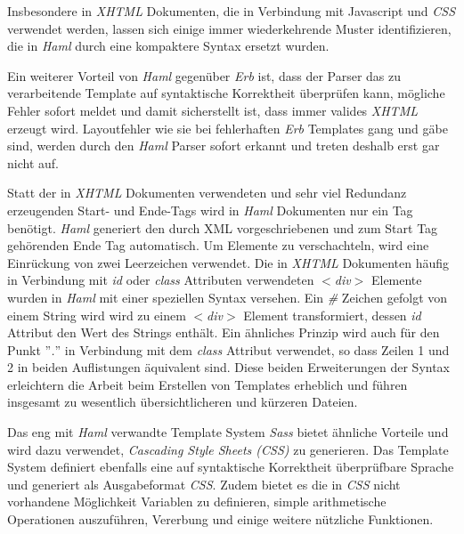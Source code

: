 

Insbesondere in \textit{XHTML} Dokumenten, die in Verbindung mit
Javascript und \textit{CSS} verwendet werden, lassen sich einige immer
wiederkehrende Muster identifizieren, die in \textit{Haml} durch eine
kompaktere Syntax ersetzt wurden.

Ein weiterer Vorteil von \textit{Haml} gegenüber \textit{Erb} ist,
dass der Parser das zu verarbeitende Template auf syntaktische
Korrektheit überprüfen kann, mögliche Fehler sofort meldet und damit
sicherstellt ist, dass immer valides \textit{XHTML} erzeugt
wird. Layoutfehler wie sie bei fehlerhaften \textit{Erb} Templates
gang und gäbe sind, werden durch den \textit{Haml} Parser sofort
erkannt und treten deshalb erst gar nicht auf.

Statt der in \textit{XHTML} Dokumenten verwendeten und sehr viel
Redundanz erzeugenden Start- und Ende-Tags wird in \textit{Haml}
Dokumenten nur ein Tag benötigt. \textit{Haml} generiert den durch XML
 vorgeschriebenen und
zum Start Tag gehörenden Ende Tag automatisch. Um Elemente zu
verschachteln, wird eine Einrückung von zwei Leerzeichen
verwendet. Die in \textit{XHTML} Dokumenten häufig in Verbindung mit
\textit{id} oder \textit{class} Attributen verwendeten
\textit{$<$div$>$} Elemente wurden in \textit{Haml} mit einer
speziellen Syntax versehen. Ein \textit{\#} Zeichen gefolgt von einem
String wird wird zu einem \textit{$<$div$>$} Element transformiert,
dessen \textit{id} Attribut den Wert des Strings enthält. Ein
ähnliches Prinzip wird auch für den Punkt ''\textit{.}''  in
Verbindung mit dem \textit{class} Attribut verwendet, so dass Zeilen 1
und 2 in beiden Auflistungen äquivalent sind. Diese beiden
Erweiterungen der Syntax erleichtern die Arbeit beim Erstellen von
Templates erheblich und führen insgesamt zu wesentlich
übersichtlicheren und kürzeren Dateien.

Das eng mit \textit{Haml} verwandte Template System \textit{Sass}
bietet ähnliche Vorteile und wird dazu verwendet, \textit{Cascading
  Style Sheets (CSS)} zu generieren. Das Template System definiert
ebenfalls eine auf syntaktische Korrektheit überprüfbare Sprache und
generiert als Ausgabeformat \textit{CSS}. Zudem bietet es die in
\textit{CSS} nicht vorhandene Möglichkeit Variablen zu definieren,
simple arithmetische Operationen auszuführen, Vererbung und einige
weitere nützliche Funktionen.

